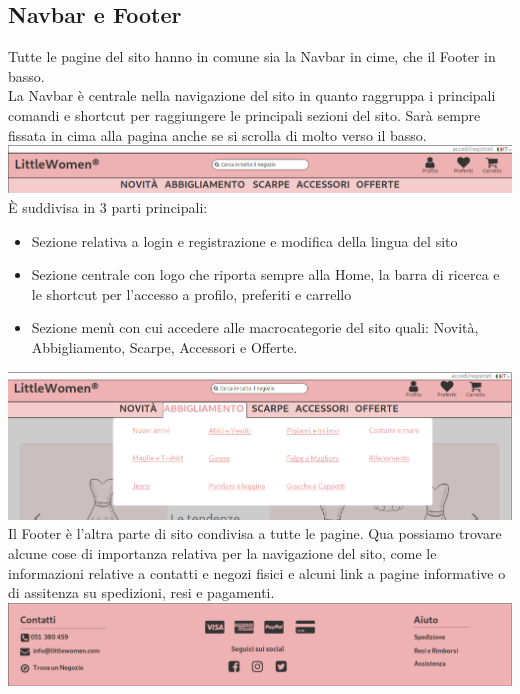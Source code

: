 \documentclass[12pt,a4paper]{report}
\begin{document}
\subsection{Navbar e Footer} Tutte le pagine del sito hanno in comune sia la Navbar in cime, che il Footer in basso.\\
La Navbar è centrale nella navigazione del sito in quanto raggruppa i principali comandi e shortcut per raggiungere le principali sezioni del sito. Sarà sempre fissata in cima alla pagina anche se si scrolla di molto verso il basso.\\
\includegraphics[width=\textwidth]{"Images Latex/Immagini Wireframe/Desktop/1 - Navbar"}\\
È suddivisa in 3 parti principali:
\begin{itemize}
  \item Sezione relativa a login e registrazione e modifica della lingua del sito
  \item Sezione centrale con logo che riporta sempre alla Home, la barra di ricerca e le shortcut per l'accesso a profilo, preferiti e carrello
  \item Sezione menù con cui accedere alle macrocategorie del sito quali: Novità, Abbigliamento, Scarpe, Accessori e Offerte.
\end{itemize}
\includegraphics[width=\textwidth]{"Images Latex/Immagini Wireframe/Desktop/4 - Navbar Menu"}
\vspace{5mm}\\
Il Footer è l'altra parte di sito condivisa a tutte le pagine. Qua possiamo trovare alcune cose di importanza relativa per la navigazione del sito, come le informazioni relative a contatti e negozi fisici e alcuni link a pagine informative o di assitenza su spedizioni, resi e pagamenti.\\
\includegraphics[width=\textwidth]{"Images Latex/Immagini Wireframe/Desktop/1 - Footer"}
\newpage
\end{document}
